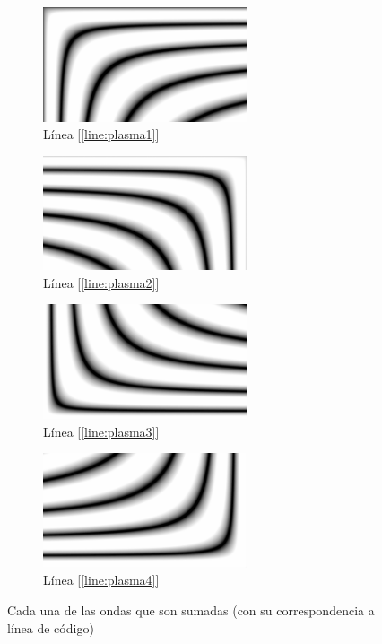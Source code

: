 \begin{figure}[h]
	\centering
	\begin{subfigure}[b]{0.45\textwidth}
		\centering
		\includegraphics[width=6cm]{archivos/plasma1}
		\caption{Línea [\ref{line:plasma1}]}
	\end{subfigure}
	\begin{subfigure}[b]{0.45\textwidth}
		\centering
		\includegraphics[width=6cm]{archivos/plasma2}
		\caption{Línea [\ref{line:plasma2}]}
	\end{subfigure}
	\begin{subfigure}[b]{0.45\textwidth}
		\centering
		\includegraphics[width=6cm]{archivos/plasma4}
		\caption{Línea [\ref{line:plasma3}]}
	\end{subfigure}
	\begin{subfigure}[b]{0.45\textwidth}
		\centering
		\includegraphics[width=6cm]{archivos/plasma3}
		\caption{Línea [\ref{line:plasma4}]}
	\end{subfigure}
	\caption{Cada una de las ondas que son sumadas (con su correspondencia a línea de código)}
	\label{fig:allwaves}
\end{figure}

